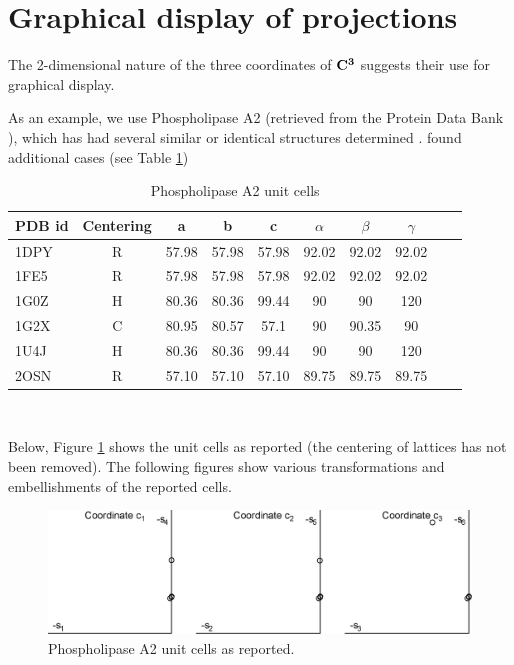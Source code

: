 \documentclass[preprint]{iucr}              %
\numberwithin{equation}{section}
\newcommand{\CIII}[0]{$\bf{C^{3}}$}
\begin{document}
	
	\section{Graphical display of projections}
	
	The 2-dimensional nature of the three coordinates of \CIII{} 
	suggests their use for graphical display. 
	
	As an example, we use Phospholipase A2 (retrieved from 
	the Protein Data Bank \cite{Bernstein1977}), which has had several similar
	or identical structures determined \cite{LeTrong2007}. 
	found additional cases (see Table \ref{PLA2})
	
	
\begin{table}
	\begin{tabular}{l c c c c c c c c c}
		\toprule
		PDB id & Centering & a&b&c&$\alpha$&$\beta$&$\gamma$\\
		\midrule
	1DPY & R& 57.98& 57.98& 57.98& 92.02& 92.02& 92.02\\
	1FE5 & R& 57.98& 57.98& 57.98& 92.02& 92.02& 92.02\\
	1G0Z & H& 80.36& 80.36& 99.44& 90&    90&    120\\
	1G2X & C& 80.95& 80.57& 57.1 & 90&    90.35&  90\\
	1U4J & H& 80.36& 80.36& 99.44& 90&    90&    120\\
	2OSN & R& 57.10& 57.10& 57.10& 89.75& 89.75&  89.75\\
	\bottomrule
\end{tabular}	\\
\caption{Phospholipase A2 unit cells}
\label{PLA2}
\end{table}

Below, Figure \ref{fig1} shows the unit cells as 
reported (the centering of lattices has not been removed).
The following figures show various transformations and
embellishments of the reported cells.

\begin{figure}
	\includegraphics[width=1.0\textwidth]{1_35}
	\caption{Phospholipase A2 unit cells as reported. }
	\label{fig1}
\end{figure}
	
\end{document}
